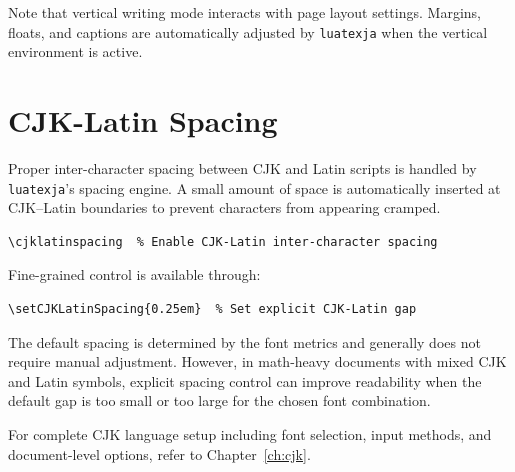 Note that vertical writing mode interacts with page layout settings.
Margins, floats, and captions are automatically adjusted by
\texttt{luatexja} when the vertical environment is active.

\section{CJK-Latin Spacing}

Proper inter-character spacing between CJK and Latin scripts is handled
by \texttt{luatexja}'s spacing engine.  A small amount of space is
automatically inserted at CJK--Latin boundaries to prevent characters
from appearing cramped.

\begin{verbatim}
\cjklatinspacing  % Enable CJK-Latin inter-character spacing
\end{verbatim}

Fine-grained control is available through:

\begin{verbatim}
\setCJKLatinSpacing{0.25em}  % Set explicit CJK-Latin gap
\end{verbatim}

The default spacing is determined by the font metrics and generally does
not require manual adjustment.  However, in math-heavy documents with
mixed CJK and Latin symbols, explicit spacing control can improve
readability when the default gap is too small or too large for the
chosen font combination.

For complete CJK language setup including font selection, input
methods, and document-level options, refer to Chapter~\ref{ch:cjk}.

